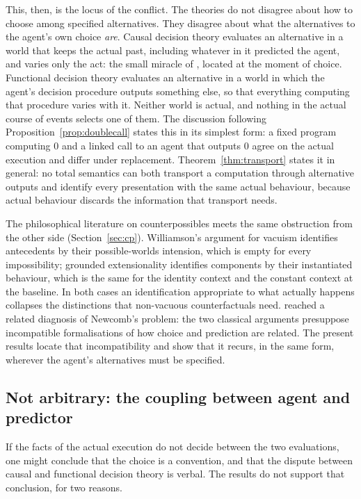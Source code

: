 This, then, is the locus of the conflict. The theories do not disagree about how to choose among
specified alternatives. They disagree about what the alternatives to the agent's own choice
\emph{are}. Causal decision theory evaluates an alternative in a world that keeps the actual past,
including whatever in it predicted the agent, and varies only the act: the small miracle of
\textcite[468]{lewis1979arrow}, located at the moment of choice. Functional decision theory evaluates an
alternative in a world in which the agent's decision procedure outputs something else, so that
everything computing that procedure varies with it. Neither world is actual, and nothing in the
actual course of events selects one of them. The discussion following
Proposition~\ref{prop:doublecall} states this in its simplest form: a fixed program computing $0$ and
a linked call to an agent that outputs $0$ agree on the actual execution and differ under
replacement. Theorem~\ref{thm:transport} states it in general: no total semantics can both transport
a computation through alternative outputs and identify every presentation with the same actual
behaviour, because actual behaviour discards the information that transport needs.

The philosophical literature on counterpossibles meets the same obstruction from the other side
(Section~\ref{sec:cp}). Williamson's argument for vacuism identifies antecedents by their
possible-worlds intension, which is empty for every impossibility; grounded extensionality identifies
components by their instantiated behaviour, which is the same for the identity context and the
constant context at the baseline. In both cases an identification appropriate to what actually
happens collapses the distinctions that non-vacuous counterfactuals need.
\textcite{wolpertbenford2013} reached a related diagnosis of Newcomb's problem: the two classical
arguments presuppose incompatible formalisations of how choice and prediction are related. The
present results locate that incompatibility and show that it recurs, in the same form, wherever the
agent's alternatives must be specified.

\subsection{Not arbitrary: the coupling between agent and predictor}\label{sec:disc-coupling}

If the facts of the actual execution do not decide between the two evaluations, one might conclude
that the choice is a convention, and that the dispute between causal and functional decision theory
is verbal. The results do not support that conclusion, for two reasons.

